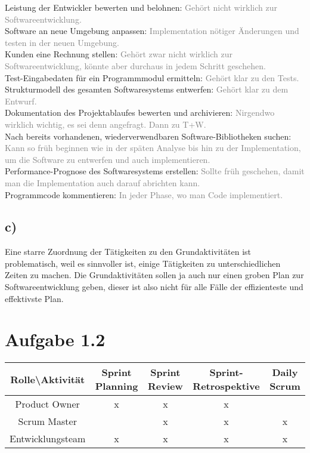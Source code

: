 \documentclass[a4paper,11pt]{scrartcl}
\begin{document}
	Leistung der Entwickler bewerten und belohnen: \textcolor{gray}{Gehört nicht wirklich zur Softwareentwicklung.}\\
	Software an neue Umgebung anpassen: \textcolor{gray}{Implementation nötiger Änderungen und testen in der neuen Umgebung.}\\		
	Kunden eine Rechnung stellen: \textcolor{gray}{Gehört zwar nicht wirklich zur Softwareentwicklung, könnte aber durchaus in jedem Schritt geschehen.}\\	
	Test-Eingabedaten für ein Programmmodul ermitteln: \textcolor{gray}{Gehört klar zu den Tests.}\\
	Strukturmodell des gesamten Softwaresystems entwerfen: \textcolor{gray}{Gehört klar zu dem Entwurf.}\\
	Dokumentation des Projektablaufes bewerten und archivieren: \textcolor{gray}{Nirgendwo wirklich wichtig, es sei denn angefragt. Dann zu T+W.}\\	
	Nach bereits vorhandenen, wiederverwendbaren Software-Bibliotheken suchen: \textcolor{gray}{Kann so früh beginnen wie in der späten Analyse bis hin zu der Implementation, um die Software zu entwerfen und auch implementieren.}\\
	Performance-Prognose des Softwaresystems erstellen: \textcolor{gray}{Sollte früh geschehen, damit man die Implementation auch darauf abrichten kann.}\\
	Programmcode kommentieren: \textcolor{gray}{In jeder Phase, wo man Code implementiert.}\\		
	
	\subsection*{c)}
	Eine starre Zuordnung der Tätigkeiten zu den Grundaktivitäten ist problematisch, weil es sinnvoller ist, einige Tätigkeiten zu unterschiedlichen Zeiten zu machen. Die Grundaktivitäten sollen ja auch nur einen groben Plan zur Softwareentwicklung geben, dieser ist also nicht für alle Fälle der effizienteste und effektivste Plan.
	
\newpage

	\section*{Aufgabe 1.2}
	
	\begin{table}[h!]
		\begin{tabular}{c|c|c|c|c}
		 \textbf{Rolle\textbackslash Aktivität} & Sprint Planning & Sprint Review & Sprint-Retrospektive & Daily Scrum \\
		 \hline
		 Product Owner		&x &x &x &  \\
		 Scrum Master		&  &x &x &x \\
		 Entwicklungsteam	&x &x &x &x \\
		\end{tabular}
	\end{table}
	
\end{document}

